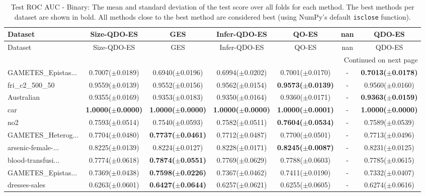 \begin{longtable}{lcccccc}
\caption{Test ROC AUC - Binary: The mean and standard deviation of the test score over all folds for each method. The best methods per dataset are shown in bold. All methods close to the best method are considered best (using NumPy’s default \texttt{isclose} function).}
\label{tab:results} \\ 
\toprule
Dataset & Size-QDO-ES & GES & Infer-QDO-ES & QO-ES & nan & QDO-ES \\
\midrule
\endfirsthead
\toprule
Dataset & Size-QDO-ES & GES & Infer-QDO-ES & QO-ES & nan & QDO-ES \\
\midrule
\endhead
\midrule
\multicolumn{7}{r}{Continued on next page} \\
\midrule
\endfoot
\bottomrule
\endlastfoot
GAMETES\_Epistas... & 0.7007($\pm$0.0189) & 0.6940($\pm$0.0196) & 0.6994($\pm$0.0202) & 0.7001($\pm$0.0170) & - & \textbf{0.7013($\pm$0.0178)} \\
fri\_c2\_500\_50 & 0.9559($\pm$0.0139) & 0.9552($\pm$0.0156) & 0.9562($\pm$0.0154) & \textbf{0.9573($\pm$0.0139)} & - & 0.9560($\pm$0.0160) \\
Australian & 0.9355($\pm$0.0169) & 0.9353($\pm$0.0183) & 0.9350($\pm$0.0164) & 0.9360($\pm$0.0171) & - & \textbf{0.9363($\pm$0.0159)} \\
car & \textbf{1.0000($\pm$0.0000)} & \textbf{1.0000($\pm$0.0000)} & \textbf{1.0000($\pm$0.0000)} & \textbf{1.0000($\pm$0.0001)} & - & \textbf{1.0000($\pm$0.0000)} \\
no2 & 0.7593($\pm$0.0514) & 0.7540($\pm$0.0593) & 0.7582($\pm$0.0511) & \textbf{0.7604($\pm$0.0534)} & - & 0.7589($\pm$0.0539) \\
GAMETES\_Heterog... & 0.7704($\pm$0.0480) & \textbf{0.7737($\pm$0.0461)} & 0.7712($\pm$0.0487) & 0.7700($\pm$0.0501) & - & 0.7713($\pm$0.0496) \\
arsenic-female-... & 0.8225($\pm$0.0139) & 0.8224($\pm$0.0127) & 0.8228($\pm$0.0171) & \textbf{0.8245($\pm$0.0087)} & - & 0.8231($\pm$0.0125) \\
blood-transfusi... & 0.7774($\pm$0.0618) & \textbf{0.7874($\pm$0.0551)} & 0.7769($\pm$0.0629) & 0.7788($\pm$0.0603) & - & 0.7785($\pm$0.0615) \\
GAMETES\_Epistas... & 0.7369($\pm$0.0438) & \textbf{0.7598($\pm$0.0226)} & 0.7367($\pm$0.0462) & 0.7411($\pm$0.0190) & - & 0.7332($\pm$0.0407) \\
dresses-sales & 0.6263($\pm$0.0601) & \textbf{0.6427($\pm$0.0644)} & 0.6257($\pm$0.0621) & 0.6255($\pm$0.0605) & - & 0.6274($\pm$0.0616) \\

\end{longtable}
